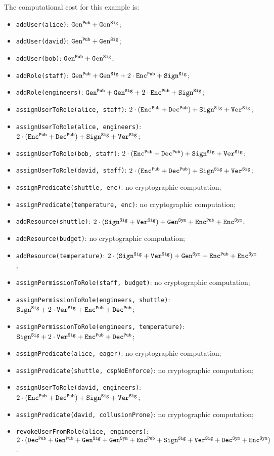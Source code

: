 The computational cost for this example is:
\begin{itemize}
	\item \texttt{addUser(alice)}: \( \cgenpub + \cgensig \);
	\item \texttt{addUser(david)}: \( \cgenpub + \cgensig \);
	\item \texttt{addUser(bob)}: \( \cgenpub + \cgensig \);
	\item \texttt{addRole(staff)}: \( \cgenpub + \cgensig + 2 \cdot \cencpub + \csig \);
	\item \texttt{addRole(engineers)}: \( \cgenpub + \cgensig + 2 \cdot \cencpub + \csig \);
	\item \texttt{assignUserToRole(alice, staff)}: \( 2 \cdot (\cencpub + \cdecpub) + \csig + \cverifysig \);
	\item \texttt{assignUserToRole(alice, engineers)}: \( 2 \cdot (\cencpub + \cdecpub) + \csig + \cverifysig \);
	\item \texttt{assignUserToRole(bob, staff)}: \( 2 \cdot (\cencpub + \cdecpub) + \csig + \cverifysig \);
	\item \texttt{assignUserToRole(david, staff)}: \( 2 \cdot (\cencpub + \cdecpub) + \csig + \cverifysig \);
	\item \texttt{assignPredicate(shuttle, enc)}: no cryptographic computation;
	\item \texttt{assignPredicate(temperature, enc)}: no cryptographic computation;
	\item \texttt{addResource(shuttle)}: \( 2 \cdot (\csig + \cverifysig) + \cgensym + \cencpub + \cencsym \);
	\item \texttt{addResource(budget)}: no cryptographic computation;
	\item \texttt{addResource(temperature)}: \( 2 \cdot (\csig + \cverifysig) + \cgensym + \cencpub + \cencsym \);
	\item \texttt{assignPermissionToRole(staff, budget)}: no cryptographic computation;
	\item \texttt{assignPermissionToRole(engineers, shuttle)}: \( \csig + 2 \cdot \cverifysig + \cencpub + \cdecpub \);
	\item \texttt{assignPermissionToRole(engineers,
		temperature)}: \( \csig + 2 \cdot \cverifysig + \cencpub + \cdecpub \);
	\item \texttt{assignPredicate(alice, eager)}: no cryptographic computation;
	\item \texttt{assignPredicate(shuttle, cspNoEnforce)}: no cryptographic computation;
	\item \texttt{assignUserToRole(david, engineers)}: \( 2 \cdot (\cencpub + \cdecpub) + \csig + \cverifysig \);
	\item \texttt{assignPredicate(david, collusionProne)}: no cryptographic computation;
	\item \texttt{revokeUserFromRole(alice, engineers)}: \( 2 \cdot (\cdecpub + \cgenpub + \cgensig + \cgensym + \cencpub + \csig + \cverifysig + \cdecsym + \cencsym) \).
\end{itemize}

